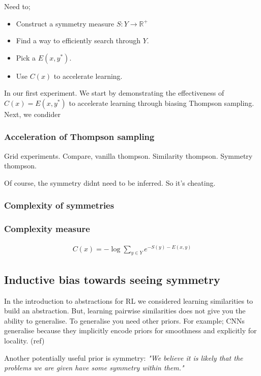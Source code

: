 Need to;

\begin{itemize}
	\tightlist
	\item Construct a symmetry measure $S: Y \to \mathbb R^+$
	\item Find a way to efficiently search through $Y$.
	\item Pick a $E(x, y^{* })$.
	\item Use $C(x)$ to accelerate learning.
\end{itemize}

In our first experiment. We start by demonstrating the effectiveness of $C(x) = E(x, y^{* })$ to accelerate learning through biasing Thompson sampling.
Next, we condider

\subsubsection{Acceleration of Thompson sampling}

Grid experiments. Compare, vanilla thompson. Similarity thompson. Symmetry thompson.

Of course, the symmetry didnt need to be inferred. So it's cheating.

\subsubsection{Complexity of symmetries}


\subsubsection{Complexity measure}

\begin{align*}
C(x) = -\log \sum_{y\in Y} e^{-S(y) - E(x, y)}
\end{align*}

\subsection{Inductive bias towards seeing symmetry}

In the introduction to abstractions for RL we considered learning similarities
to build an abstraction. But, learning pairwise similarities does not give
you the ability to generalise. To generalise you need other priors. For example;
CNNs generalise because they implicitly encode priors for smoothness and explicitly for locality. (ref)

Another potentially useful prior is symmetry: \textit{"We believe it is likely that
the problems we are given have some symmetry within them."}


